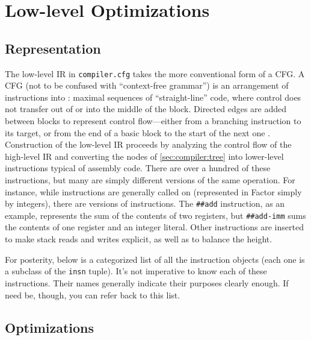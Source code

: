 \section{Low-level Optimizations}\label{sec:compiler:cfg}

\subsection{Representation}

The low-level \gls{IR} in \Verb|compiler.cfg| takes the more conventional form
of a \gls{CFG}.  A \gls{CFG} (not to be confused with ``context-free grammar'')
is an arrangement of instructions into : maximal sequences
of ``straight-line'' code, where control does not transfer out of or into the
middle of the block.  Directed edges are added between blocks to represent
control flow---either from a branching instruction to its target, or from the
end of a basic block to the start of the next one \autocite{DragonBook}.
Construction of the low-level \gls{IR} proceeds by analyzing the control flow
of the high-level \gls{IR} and converting the nodes of \cref{sec:compiler:tree}
into lower-level instructions typical of assembly code.  There are over a
hundred of these instructions, but many are simply different versions of the
same operation.  For instance, while instructions are generally called on
 (represented in Factor simply by integers), there are
 versions of instructions.  The \Verb|##add| instruction, as an
example, represents the sum of the contents of two registers, but
\Verb|##add-imm| sums the contents of one register and an integer literal.
Other instructions are inserted to make stack reads and writes explicit, as
well as to balance the height.

For posterity, below is a categorized list of all the instruction objects (each
one is a subclass of the \Verb|insn| tuple).  It's not imperative to know each
of these instructions.  Their names generally indicate their purposes clearly
enough.  If need be, though, you can refer back to this list.



\subsection{Optimizations}

